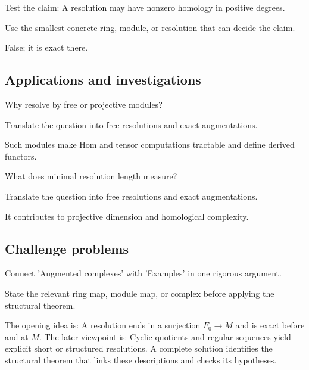 \begin{exercise}\label{exr:v23-expand-12}
Test the claim: A resolution may have nonzero homology in positive degrees.
\end{exercise}
\begin{hint}
Use the smallest concrete ring, module, or resolution that can decide the claim.
\end{hint}
\begin{solution}
False; it is exact there.
\end{solution}

\subsection*{Applications and investigations}

\begin{exercise}\label{exr:v23-expand-13}
Why resolve by free or projective modules?
\end{exercise}
\begin{hint}
Translate the question into free resolutions and exact augmentations.
\end{hint}
\begin{solution}
Such modules make Hom and tensor computations tractable and define derived functors.
\end{solution}

\begin{exercise}[Complexity]\label{exr:v23-expand-14}
What does minimal resolution length measure?
\end{exercise}
\begin{hint}
Translate the question into free resolutions and exact augmentations.
\end{hint}
\begin{solution}
It contributes to projective dimension and homological complexity.
\end{solution}

\subsection*{Challenge problems}

\begin{exercise}\label{exr:v23-expand-15}
Connect 'Augmented complexes' with 'Examples' in one rigorous argument.
\end{exercise}
\begin{hint}
State the relevant ring map, module map, or complex before applying the structural theorem.
\end{hint}
\begin{solution}
The opening idea is: A resolution ends in a surjection $F_0\to M$ and is exact before and at $M$. The later viewpoint is: Cyclic quotients and regular sequences yield explicit short or structured resolutions. A complete solution identifies the structural theorem that links these descriptions and checks its hypotheses.
\end{solution}

